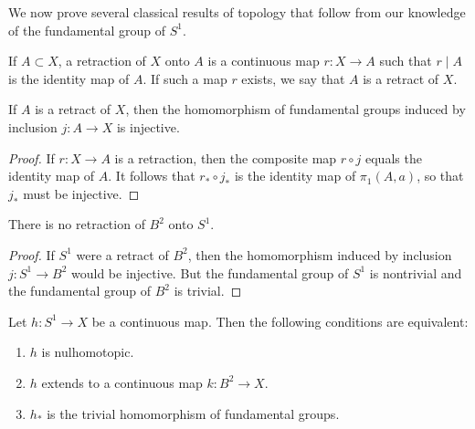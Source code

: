 We now prove several classical results of topology that follow from our knowledge of the fundamental group of \(S^{1}\).

\begin{definition}
If \(A \subset X\), a retraction of \(X\) onto \(A\) is a continuous map \(r : X \rightarrow A\) such that \(r \mid A\) is the identity map of \(A\). If such a map \(r\) exists, we say that \(A\) is a retract of \(X\).
\end{definition}

\begin{lemma}
\label{lem:\thetheorem}
If \(A\) is a retract of \(X\), then the homomorphism of fundamental groups induced by inclusion \(j : A \rightarrow X\) is injective.
\end{lemma}

\begin{proof}
If \(r : X \rightarrow A\) is a retraction, then the composite map \(r \circ j\) equals the identity map of \(A\). It follows that \(r_{ * } \circ {j}_{ * }\) is the identity map of \({\pi }_{1}( {A,a})\), so that \(j_{ * }\) must be injective.
\end{proof}
\begin{theorem}
\label{thm:\thetheorem}
There is no retraction of \(B^{2}\) onto \(S^{1}\).
\end{theorem}

\begin{proof}
If \(S^{1}\) were a retract of \(B^{2}\), then the homomorphism induced by inclusion \(j : S^{1} \rightarrow {B}^{2}\) would be injective. But the fundamental group of \(S^{1}\) is nontrivial and the fundamental group of \(B^{2}\) is trivial.
\end{proof}
\begin{lemma}
\label{lem:\thetheorem}
Let \(h : S^{1} \rightarrow X\) be a continuous map. Then the following conditions are equivalent:

\begin{enumerate}[itemsep=0.2em, parsep=0pt, topsep=0pt, partopsep=0pt, leftmargin=*, label=(\arabic*), align=left]
\item \(h\) is nulhomotopic.

\item \(h\) extends to a continuous map \(k : B^{2} \rightarrow X\).

\item \(h_{ * }\) is the trivial homomorphism of fundamental groups.
\end{enumerate}
\end{lemma}

